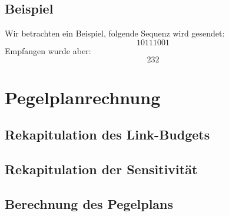 \subsection{Beispiel}
Wir betrachten ein Beispiel, folgende Sequenz wird gesendet:
\begin{equation}
    10111001
\end{equation}
Empfangen wurde aber:
\begin{equation}
      232

\end{equation}

\section{Pegelplanrechnung}
\subsection{Rekapitulation des Link-Budgets}
\subsection{Rekapitulation der Sensitivität}
\subsection{Berechnung des Pegelplans}